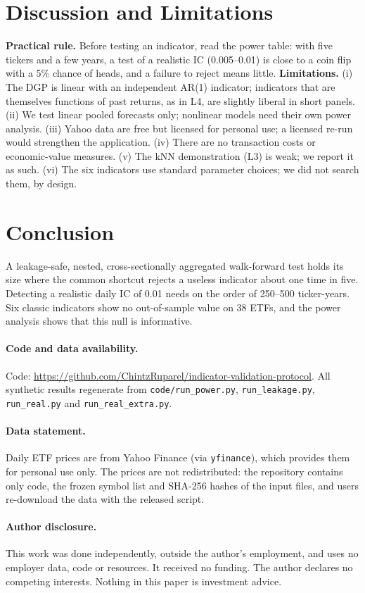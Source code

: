 \documentclass[11pt]{article}
\begin{document}
\section{Discussion and Limitations}
\textbf{Practical rule.} Before testing an indicator, read the power table: with five tickers and a few years, a test of a realistic IC (0.005--0.01) is close to a coin flip with a 5\% chance of heads, and a failure to reject means little. \textbf{Limitations.} (i) The DGP is linear with an independent AR(1) indicator; indicators that are themselves functions of past returns, as in L4, are slightly liberal in short panels. (ii) We test linear pooled forecasts only; nonlinear models need their own power analysis. (iii) Yahoo data are free but licensed for personal use; a licensed re-run would strengthen the application. (iv) There are no transaction costs or economic-value measures. (v) The kNN demonstration (L3) is weak; we report it as such. (vi) The six indicators use standard parameter choices; we did not search them, by design.

\section{Conclusion}
A leakage-safe, nested, cross-sectionally aggregated walk-forward test holds its size where the common shortcut rejects a useless indicator about one time in five. Detecting a realistic daily IC of 0.01 needs on the order of 250--500 ticker-years. Six classic indicators show no out-of-sample value on 38 ETFs, and the power analysis shows that this null is informative.

\paragraph{Code and data availability.} Code: \url{https://github.com/ChintzRuparel/indicator-validation-protocol}. All synthetic results regenerate from \texttt{code/run\_power.py}, \texttt{run\_leakage.py}, \texttt{run\_real.py} and \texttt{run\_real\_extra.py}.
\paragraph{Data statement.} Daily ETF prices are from Yahoo Finance (via \texttt{yfinance}), which provides them for personal use only. The prices are not redistributed: the repository contains only code, the frozen symbol list and SHA-256 hashes of the input files, and users re-download the data with the released script.
\paragraph{Author disclosure.} This work was done independently, outside the author's employment, and uses no employer data, code or resources. It received no funding. The author declares no competing interests. Nothing in this paper is investment advice.



\end{document}
